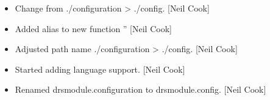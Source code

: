 \documentclass[a4paper,10pt,english]{report}
\begin{document}
\begin{itemize}
\item {} 
Change from ./configuration \textendash{}\textgreater{} ./config. {[}Neil Cook{]}

\item {} 
Added alias to new function ” {[}Neil Cook{]}

\item {} 
Adjusted path name ./configuration \textendash{}\textgreater{} ./config. {[}Neil Cook{]}

\item {} 
Started adding language support. {[}Neil Cook{]}

\item {} 
Renamed drsmodule.configuration to drsmodule.config. {[}Neil Cook{]}

\end{itemize}
\end{document}
